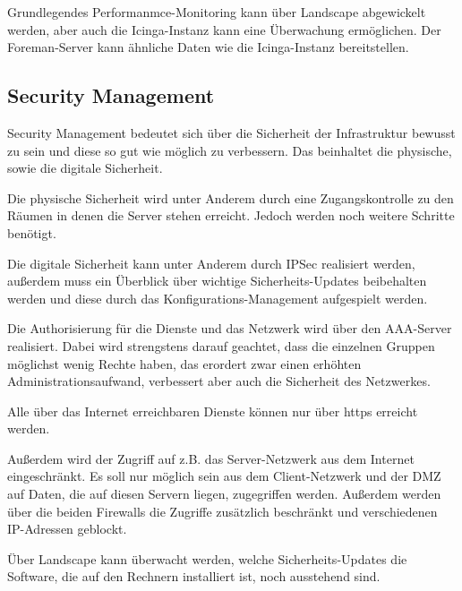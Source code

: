 Grundlegendes Performanmce-Monitoring kann über Landscape abgewickelt werden, aber auch die Icinga-Instanz kann eine Überwachung ermöglichen. 
Der Foreman-Server kann ähnliche Daten wie die Icinga-Instanz bereitstellen.


\subsection{Security Management}
Security Management bedeutet sich über die Sicherheit der Infrastruktur bewusst zu sein und diese so gut wie möglich zu verbessern. Das beinhaltet die physische, sowie die digitale Sicherheit.

Die physische Sicherheit wird unter Anderem durch eine Zugangskontrolle zu den Räumen in denen die Server stehen erreicht. Jedoch werden noch weitere Schritte benötigt.

Die digitale Sicherheit kann unter Anderem durch IPSec realisiert werden, außerdem muss ein Überblick über wichtige Sicherheits-Updates beibehalten werden und diese durch das Konfigurations-Management aufgespielt werden.

Die Authorisierung für die Dienste und das Netzwerk wird über den AAA-Server realisiert. Dabei wird strengstens darauf geachtet, dass die einzelnen Gruppen möglichst wenig Rechte haben, das erordert zwar einen erhöhten Administrationsaufwand, verbessert aber auch die Sicherheit des Netzwerkes.

Alle über das Internet erreichbaren Dienste können nur über https erreicht werden.

Außerdem wird der Zugriff auf z.B. das Server-Netzwerk aus dem Internet eingeschränkt. Es soll nur möglich sein aus dem Client-Netzwerk und der DMZ auf Daten, die auf diesen Servern liegen, zugegriffen werden. Außerdem werden über die beiden Firewalls die Zugriffe zusätzlich beschränkt und verschiedenen IP-Adressen geblockt.

Über Landscape kann überwacht werden, welche Sicherheits-Updates die Software, die auf den Rechnern installiert ist, noch ausstehend sind.
